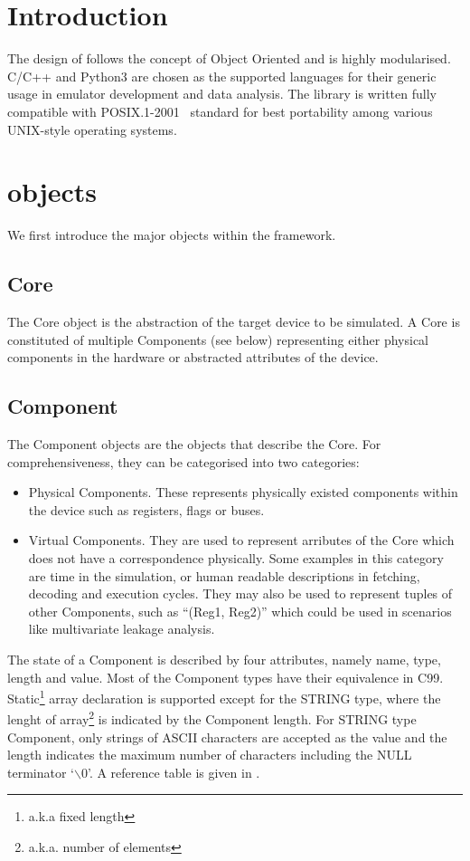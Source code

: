 \documentclass[]{report}
\begin{document}
\section{Introduction}
The design of \smurf follows the concept of Object Oriented and is highly modularised. C/C++ and Python3 are chosen as the supported languages for their generic usage in emulator development and data analysis. The library is written fully compatible with POSIX.1-2001~\cite{POSIX} standard for best portability among various UNIX-style operating systems.

\section{\smurf objects\label{sec:SmurfObjects}}
We first introduce the major objects within the \smurf framework.

\subsection{Core}
The Core object is the abstraction of the target device to be simulated. A Core is constituted of multiple Components (see below) representing either physical components in the hardware or abstracted attributes of the device.

\subsection{Component}
The Component objects are the objects that describe the Core. For comprehensiveness, they can be categorised into two categories:
\begin{itemize}
	\item Physical Components. These represents physically existed components within the device such as registers, flags or buses.
	\item Virtual Components. They are used to represent arributes of the Core which does not have a correspondence physically. Some examples in this category are time in the simulation, or human readable descriptions in fetching, decoding and execution cycles. They may also be used to represent tuples of other Components, such as ``(Reg1, Reg2)'' which could be used in scenarios like multivariate leakage analysis.
\end{itemize}

The state of a Component is described by four attributes, namely name, type, length and value. Most of the Component types have their equivalence in C99. Static\footnote{a.k.a fixed length} array declaration is supported except for the STRING type, where the lenght of array\footnote{a.k.a. number of elements} is indicated by the Component length. For STRING type Component, only strings of ASCII characters are accepted as the value and the length indicates the maximum number of characters including the NULL terminator `$\backslash 0$'. A reference table is given in .
\end{document}
